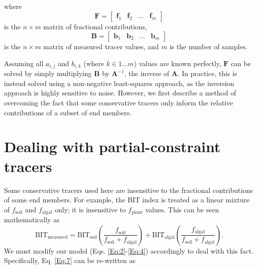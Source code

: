 \documentclass{amsart}
\begin{document}
%
where
%
\begin{equation}\label{Eq:5}
	\bm{F} = 
	\begin{bmatrix} 
		\bm{f}_1 & \bm{f}_2 & \dots & \bm{f}_m
	\end{bmatrix}
\end{equation}
%
is the $n \times m$ matrix of fractional contributions,
%
\begin{equation}\label{Eq:6}
	\bm{B} = 
	\begin{bmatrix} 
		\bm{b}_1 & \bm{b}_2 & \dots & \bm{b}_m 
	\end{bmatrix}
\end{equation}
%
is the $n \times m$ matrix of measured tracer values, and $m$ is the number of samples.

Assuming all $a_{i,j}$ and $b_{i,k}$ (where $k \in 1 \dots m$) values are known perfectly, $\bm{F}$ can be solved by simply multiplying $\bm{B}$ by $\bm{A}^{-1}$, the inverse of $\bm{A}$. In practice, this is instead solved using a non-negative least-squares approach, as the inversion approach is highly sensitive to noise. However, we first describe a method of overcoming the fact that some conservative tracers only inform the relative contributions of a subset of end members.

\section{Dealing with partial-constraint tracers}\label{Sec:2}
%
Some conservative tracers used here are insensitive to the fractional contributions of some end members. For example, the BIT index is treated as a linear mixture of $f_\text{soil}$ and $f_\text{algal}$ only; it is insensitive to $f_\text{plant}$ values. This can be seen mathematically as
%
\begin{equation}\label{Eq:7}
	\text{BIT}_\text{measured} = \text{BIT}_\text{soil} \left( \frac{f_\text{soil}}{f_\text{soil} + f_\text{algal}} \right) + \text{BIT}_\text{algal} \left( \frac{f_\text{algal}}{f_\text{soil} + f_\text{algal}} \right).
\end{equation}
%
We must modify our model (Eqs. \ref{Eq:2}-\ref{Eq:4}) accordingly to deal with this fact. Specifically, Eq. \ref{Eq:7} can be re-written as
\end{document}

